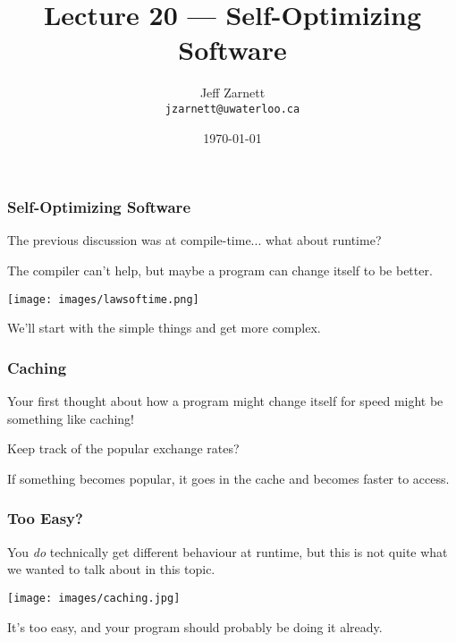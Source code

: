 


\title{Lecture 20 --- Self-Optimizing Software }

\author{Jeff Zarnett \\ \small \texttt{jzarnett@uwaterloo.ca}}
\date{\today}




\begin{frame}
  \titlepage

\end{frame}


\begin{frame}
\frametitle{Self-Optimizing Software}
The previous discussion was at compile-time... what about runtime?

The compiler can't help, but maybe a program can change itself to be better.

\begin{center}
	\texttt{[image: images/lawsoftime.png]}
\end{center}

We'll start with the simple things and get more complex.
\end{frame}


\begin{frame}
\frametitle{Caching}

Your first thought about how a program might change itself for speed might be something like caching!

Keep track of the popular exchange rates?

If something becomes popular, it goes in the cache and becomes faster to access.

\end{frame}

\begin{frame}
\frametitle{Too Easy?}

You \textit{do} technically get different behaviour at runtime, but this is not quite what we wanted to talk about in this topic. 

\begin{center}
	\texttt{[image: images/caching.jpg]}
\end{center}

It's too easy, and your program should probably be doing it already.

\end{frame}


